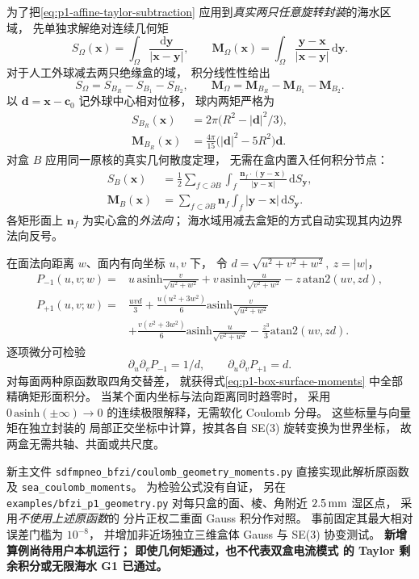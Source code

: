 为了把\eqref{eq:p1-affine-taylor-subtraction}
应用到\emph{真实两只任意旋转封装}的海水区域，
先单独求解绝对连续几何矩
\[
S_\Omega(\bm x)=\int_\Omega
\frac{\mathrm d\bm y}{|\bm x-\bm y|},\qquad
\bm M_\Omega(\bm x)=\int_\Omega
\frac{\bm y-\bm x}{|\bm x-\bm y|}
\,\mathrm d\bm y .
\]
对于人工外球减去两只绝缘盒的域，
积分线性性给出
\[
S_\Omega=S_{B_R}-S_{B_1}-S_{B_2},\qquad
\bm M_\Omega=\bm M_{B_R}-\bm M_{B_1}-\bm M_{B_2}.
\]
以 $\bm d=\bm x-\bm c_0$ 记外球中心相对位移，
球内两矩严格为
\begin{align}
S_{B_R}(\bm x)&=
2\pi\bigl(R^2-|\bm d|^2/3\bigr),\\
\bm M_{B_R}(\bm x)&=
\frac{4\pi}{15}\bigl(|\bm d|^2-5R^2\bigr)\bm d .
\end{align}
对盒 $B$ 应用同一原核的真实几何散度定理，
无需在盒内置入任何积分节点：
\begin{align}
S_B(\bm x)&=\frac12
\sum_{f\subset\partial B}
\int_f
\frac{\bm n_f\cdot(\bm y-\bm x)}
{|\bm y-\bm x|}\,\mathrm dS_{\bm y},\\
\bm M_B(\bm x)&=\sum_{f\subset\partial B}
\bm n_f\int_f|\bm y-\bm x|\,
\mathrm dS_{\bm y}.
\label{eq:p1-box-surface-moments}
\end{align}
各矩形面上 $\bm n_f$ 为实心盒的\emph{外法向}；
海水域用减去盒矩的方式自动实现其内边界法向反号。

在面法向距离 $w$、面内有向坐标 $u,v$ 下，
令 $d=\sqrt{u^2+v^2+w^2},\ z=|w|$，
\[
\begin{aligned}
P_{-1}(u,v;w)={}&
u\,\mathrm{asinh}\frac{v}{\sqrt{u^2+w^2}}+
v\,\mathrm{asinh}\frac{u}{\sqrt{v^2+w^2}}-
z\,\mathrm{atan2}(uv,zd),\\
P_{+1}(u,v;w)={}&
\frac{uvd}{3}
+\frac{u(u^2+3w^2)}6
 \mathrm{asinh}\frac{v}{\sqrt{u^2+w^2}}\\
&+\frac{v(v^2+3w^2)}6
 \mathrm{asinh}\frac{u}{\sqrt{v^2+w^2}}
-\frac{z^3}{3}\mathrm{atan2}(uv,zd).
\end{aligned}
\]
逐项微分可检验
\[
\partial_u\partial_v P_{-1}=1/d,
\qquad
\partial_u\partial_v P_{+1}=d.
\]
对每面两种原函数取四角交替差，
就获得式\eqref{eq:p1-box-surface-moments}
中全部精确矩形面积分。
当某个面内坐标与法向距离同时趋零时，
采用 $0\,\mathrm{asinh}(\pm\infty)\to0$
的连续极限解释，无需软化 Coulomb 分母。
这些标量与向量矩在独立封装的
局部正交坐标中计算，按其各自 SE(3)
旋转变换为世界坐标，
故两盒无需共轴、共面或共尺度。

新主文件
\texttt{sdfmpneo\_bfzi/coulomb\_geometry\_moments.py}
直接实现此解析原函数及
\texttt{sea\_coulomb\_moments}。
为检验公式没有自证，
另在
\texttt{examples/bfzi\_p1\_geometry.py}
对每只盒的面、棱、角附近
$2.5\,{\rm mm}$ 湿区点，
采用\emph{不使用上述原函数}的
分片正权二重面 Gauss 积分作对照。
事前固定其最大相对误差门槛为 $10^{-8}$，
并增加非近场独立三维盒体 Gauss
与 SE(3) 协变测试。
\textbf{新增算例尚待用户本机运行；
即使几何矩通过，也不代表双盒电流模式
的 Taylor 剩余积分或无限海水 G1 已通过。}


